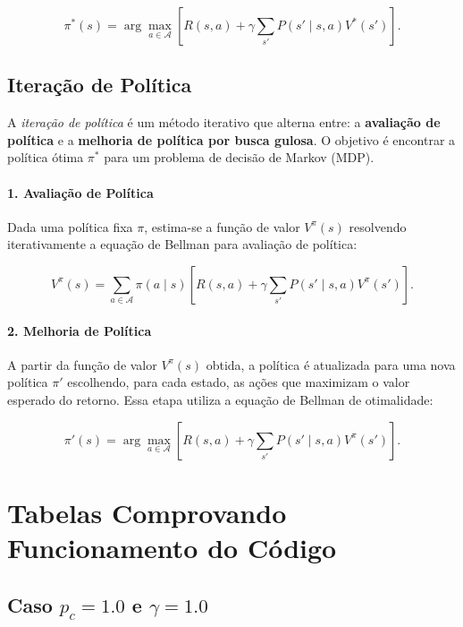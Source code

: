 \documentclass[a4paper,12pt]{article}
\begin{document}
\begin{equation}
\pi^*(s) = \arg\max_{a \in \mathcal{A}} \left[ R(s, a) + \gamma \sum_{s'} P(s' \mid s, a) V^*(s') \right].
\end{equation}

\newpage

\subsection{Iteração de Política}


A \textit{iteração de política} é um método iterativo que alterna entre: a \textbf{avaliação de política} e a \textbf{melhoria de política por busca gulosa}. O objetivo é encontrar a política ótima $\pi^*$ para um problema de decisão de Markov (MDP).

\paragraph{1. Avaliação de Política} Dada uma política fixa $\pi$, estima-se a função de valor $V^\pi(s)$ resolvendo iterativamente a equação de Bellman para avaliação de política:

\begin{equation}
V^\pi(s) = \sum_{a \in \mathcal{A}} \pi(a \mid s) \left[ R(s, a) + \gamma \sum_{s'} P(s' \mid s, a) V^\pi(s') \right].
\end{equation}

\paragraph{2. Melhoria de Política} A partir da função de valor $V^\pi(s)$ obtida, a política é atualizada para uma nova política $\pi'$ escolhendo, para cada estado, as ações que maximizam o valor esperado do retorno. Essa etapa utiliza a equação de Bellman de otimalidade:

\begin{equation}
\pi'(s) = \arg\max_{a \in \mathcal{A}} \left[ R(s, a) + \gamma \sum_{s'} P(s' \mid s, a) V^\pi(s') \right].
\end{equation}

\newpage

\section{Tabelas Comprovando Funcionamento do Código}

\subsection{Caso $p_c=1.0$ e $\gamma=1.0$}
\end{document}
